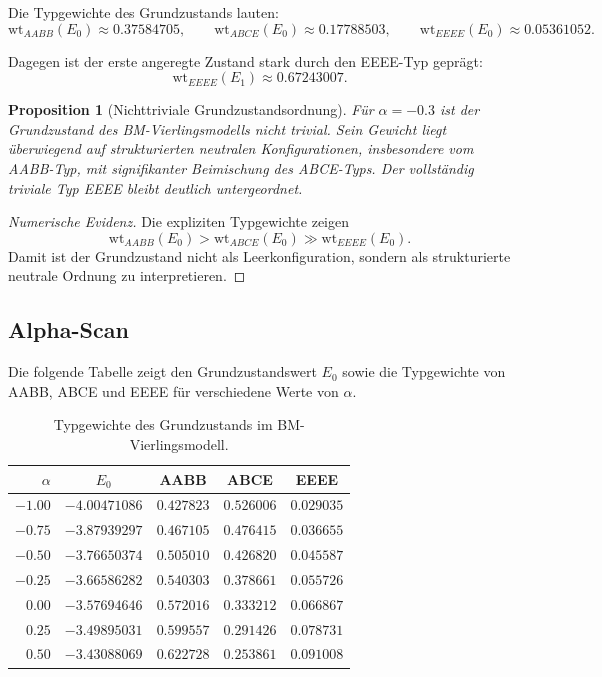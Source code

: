 \documentclass[11pt,a4paper]{article}
\newtheorem{proposition}[definition]{Proposition}
\newcommand{\wt}{\mathrm{wt}}
\begin{document}
	Die Typgewichte des Grundzustands lauten:
	\[
	\wt_{AABB}(E_0)\approx 0.37584705,\qquad
	\wt_{ABCE}(E_0)\approx 0.17788503,\qquad
	\wt_{EEEE}(E_0)\approx 0.05361052.
	\]
	
	Dagegen ist der erste angeregte Zustand stark durch den EEEE-Typ geprägt:
	\[
	\wt_{EEEE}(E_1)\approx 0.67243007.
	\]
	
	\begin{proposition}[Nichttriviale Grundzustandsordnung]
		Für \(\alpha=-0.3\) ist der Grundzustand des BM-Vierlingsmodells nicht trivial. Sein Gewicht liegt überwiegend auf strukturierten neutralen Konfigurationen, insbesondere vom AABB-Typ, mit signifikanter Beimischung des ABCE-Typs. Der vollständig triviale Typ EEEE bleibt deutlich untergeordnet.
	\end{proposition}
	
	\begin{proof}[Numerische Evidenz]
		Die expliziten Typgewichte zeigen
		\[
		\wt_{AABB}(E_0)>\wt_{ABCE}(E_0)\gg \wt_{EEEE}(E_0).
		\]
		Damit ist der Grundzustand nicht als Leerkonfiguration, sondern als strukturierte neutrale Ordnung zu interpretieren.
	\end{proof}
	
	\subsection{Alpha-Scan}
	
	Die folgende Tabelle zeigt den Grundzustandswert \(E_0\) sowie die Typgewichte von AABB, ABCE und EEEE für verschiedene Werte von \(\alpha\).
	
	\begin{table}[h]
		\centering
		\begin{tabular}{rcccc}
			\toprule
			$\alpha$ & $E_0$ & AABB & ABCE & EEEE \\
			\midrule
			$-1.00$ & $-4.00471086$ & $0.427823$ & $0.526006$ & $0.029035$ \\
			$-0.75$ & $-3.87939297$ & $0.467105$ & $0.476415$ & $0.036655$ \\
			$-0.50$ & $-3.76650374$ & $0.505010$ & $0.426820$ & $0.045587$ \\
			$-0.25$ & $-3.66586282$ & $0.540303$ & $0.378661$ & $0.055726$ \\
			$0.00$  & $-3.57694646$ & $0.572016$ & $0.333212$ & $0.066867$ \\
			$0.25$  & $-3.49895031$ & $0.599557$ & $0.291426$ & $0.078731$ \\
			$0.50$  & $-3.43088069$ & $0.622728$ & $0.253861$ & $0.091008$ \\
			\bottomrule
		\end{tabular}
		\caption{Typgewichte des Grundzustands im BM-Vierlingsmodell.}
	\end{table}
	
\end{document}
